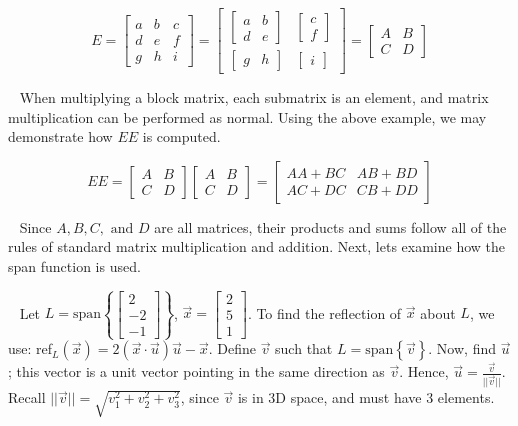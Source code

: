 \documentclass[12pt]{article}
\begin{document}
$$E=\begin{bmatrix}
a & b & c\\d & e & f\\g & h & i
\end{bmatrix}=\begin{bmatrix}
\begin{bmatrix}
a & b\\d & e
\end{bmatrix} &
\begin{bmatrix}
c\\f
\end{bmatrix}\\
\begin{bmatrix}
g & h
\end{bmatrix} &
\begin{bmatrix}
i
\end{bmatrix}
\end{bmatrix}=\begin{bmatrix}
A & B\\C & D
\end{bmatrix}
$$

$\,\,\,$ When multiplying a block matrix, each submatrix is an element, and matrix multiplication can be performed as normal. Using the above example, we may demonstrate how $EE$ is computed.

$$
EE=\begin{bmatrix}
A & B\\C & D
\end{bmatrix}\begin{bmatrix}
A & B\\C & D
\end{bmatrix}=
\begin{bmatrix}
AA+BC & AB+BD\\AC+DC & CB+DD
\end{bmatrix}
$$

$\,\,\,$ Since $A,B,C,\text{ and }D$ are all matrices, their products and sums follow all of the rules of standard matrix multiplication and addition. Next, lets examine how the span function is used.

$\,\,\,$ Let $L=\text{span}\left\lbrace\begin{bmatrix}2\\-2\\-1\end{bmatrix}\right\rbrace$, $\vec{x}=\begin{bmatrix}2\\5\\1\end{bmatrix}$. To find the reflection of $\vec{x}$ about $L$, we use: ref$_L(\vec{x})=2(\vec{x}\cdot\vec{u})\vec{u}-\vec{x}$. Define $\vec{v}$ such that $L=\text{span}\left\lbrace\vec{v}\right\rbrace$. Now, find $\vec{u}$; this vector is a unit vector pointing in the same direction as $\vec{v}$. Hence, $\vec{u}=\frac{\vec{v}}{||\vec{v}||}$. Recall $||\vec{v}||=\sqrt{v_1^2+v_2^2+v_3^2}$, since $\vec{v}$ is in 3D space, and must have 3 elements.
\end{document}
